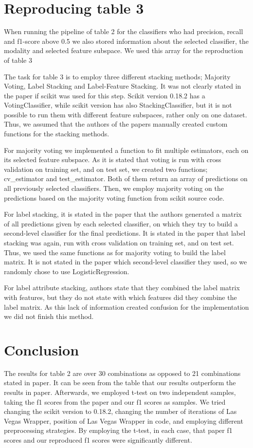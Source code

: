 \documentclass[sigconf]{acmart}
\begin{document}
\section{Reproducing table 3}
When running the pipeline of table 2 for the classifiers who had precision, recall and f1-score above 0.5 we also stored information about the selected classifier, the modality and selected feature subspace. We used this array for the reproduction of table 3

The task for table 3 is to employ three different stacking methods; Majority Voting, Label Stacking and Label-Feature Stacking. It was not clearly stated in the paper if scikit was used for this step. Scikit version 0.18.2 has a VotingClassifier, while scikit version has also StackingClassifier, but it is not possible to run them with different feature subspaces, rather only on one dataset. Thus, we assumed that the authors of the papers manually created custom functions for the stacking methods.

For majority voting we implemented a function to fit multiple estimators, each on its selected feature subspace. As it is stated that voting is run with cross validation on training set, and on test set, we created two functions; cv\_estimator and test\_estimator. Both of them return an array of predictions on all previously selected classifiers. Then, we employ majority voting on the predictions based on the majority voting function from scikit source code.

For label stacking, it is stated in the paper that the authors generated a matrix of all predictions given by each selected classifier, on which they try to build a second-level classifier for the final predictions. It is stated in the paper that label stacking was again, run with cross validation on training set, and on test set. Thus, we used the same functions as for majority voting to build the label matrix. It is not stated in the paper which second-level classifier they used, so we randomly chose to use LogisticRegression.

For label attribute stacking, authors state that they combined the label matrix with features, but they do not state with which features did they combine the label matrix. As this lack of information created confusion for the implementation we did not finish this method.

\section{Conclusion}
The results for table 2 are over 30 combinations as opposed to 21 combinations stated in paper. It can be seen from the table that our results outperform the results in paper. 
Afterwards, we employed t-test on two independent samples, taking the f1 scores from the paper and our f1 scores as samples. We tried changing the scikit version to 0.18.2, changing the number of  iterations of Las Vegas Wrapper, position of Las Vegas Wrapper in code, and employing different preprocessing strategies. By employing the t-test, in each case, that paper f1 scores and our reproduced f1 scores were significantly different. 
\end{document}
